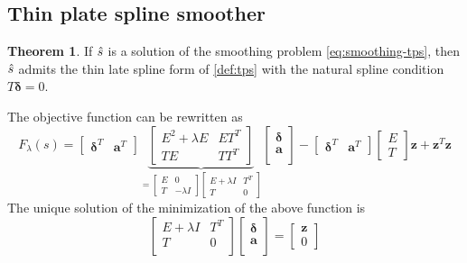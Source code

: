 \documentclass[12pt, openany]{report}
\theoremstyle{definition}
\newtheorem{thm}{Theorem}[chapter]
\begin{document}
\subsection{Thin plate spline smoother}
\begin{thm}
    If $\Hat s$ is a solution of the smoothing problem \eqref{eq:smoothing-tps}, then $\Hat s$ admits the thin late spline form of \ref{def:tps} with the natural spline condition $T\pmb{\delta} =0$.
\end{thm}
The objective function can be rewritten as 
\begin{equation}
    F_\lambda (s) = \begin{bmatrix} \pmb{\delta}^T &\pmb{a}^T\end{bmatrix}\underbrace{\begin{bmatrix}
    E^2+\lambda E & ET^T\\ TE & TT^T
    \end{bmatrix}}_{= \begin{bmatrix} E&0\\ T& -\lambda I\end{bmatrix}\begin{bmatrix} E+\lambda I& T^T\\ T & 0\end{bmatrix}} \begin{bmatrix}
        \pmb{\delta}\\ \pmb{a}\\
    \end{bmatrix} - \begin{bmatrix} \pmb{\delta}^T &\pmb{a}^T\end{bmatrix} \begin{bmatrix}
        E\\T
    \end{bmatrix} \pmb{z} + \pmb{z}^T\pmb{z}
\end{equation}
The unique solution of the minimization of the above function is 
\begin{equation}
    \begin{bmatrix}
        E+\lambda I & T^T\\ T & 0\\
    \end{bmatrix} \begin{bmatrix}
        \pmb{\delta}\\ \pmb{a}\\
    \end{bmatrix} = \begin{bmatrix}
        \pmb{z} \\ 0
    \end{bmatrix}
\end{equation}
\end{document}
